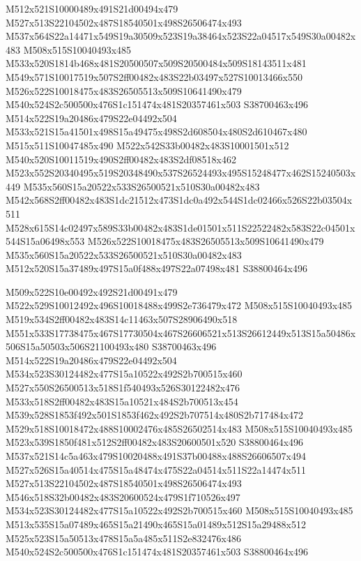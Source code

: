 \documentclass{article}
\begin{document}
\begin{multicols}{2}

M512x521S10000489x491S21d00494x479 M527x513S22104502x487S18540501x498S26506474x493 M537x564S22a14471x549S19a30509x523S19a38464x523S22a04517x549S30a00482x483 M508x515S10040493x485 M533x520S1814b468x481S20500507x509S20500484x509S18143511x481 M549x571S10017519x507S2ff00482x483S22b03497x527S10013466x550 M526x522S10018475x483S26505513x509S10641490x479 M540x524S2c500500x476S1c151474x481S20357461x503 S38700463x496 M514x522S19a20486x479S22e04492x504 M533x521S15a41501x498S15a49475x498S2d608504x480S2d610467x480 M515x511S10047485x490 M522x542S33b00482x483S10001501x512 M540x520S10011519x490S2ff00482x483S2df08518x462 M523x552S20340495x519S20348490x537S26524493x495S15248477x462S15240503x449 M535x560S15a20522x533S26500521x510S30a00482x483 M542x568S2ff00482x483S1dc21512x473S1dc0a492x544S1dc02466x526S22b03504x511 M528x615S14c02497x589S33b00482x483S1de01501x511S22522482x583S22c04501x544S15a06498x553 M526x522S10018475x483S26505513x509S10641490x479 M535x560S15a20522x533S26500521x510S30a00482x483 M512x520S15a37489x497S15a0f488x497S22a07498x481 S38800464x496

M509x522S10e00492x492S21d00491x479 M522x529S10012492x496S10018488x499S2e736479x472 M508x515S10040493x485 M519x534S2ff00482x483S14c11463x507S28906490x518 M551x533S17738475x467S17730504x467S26606521x513S26612449x513S15a50486x506S15a50503x506S21100493x480 S38700463x496 M514x522S19a20486x479S22e04492x504 M534x523S30124482x477S15a10522x492S2b700515x460 M527x550S26500513x518S1f540493x526S30122482x476 M533x518S2ff00482x483S15a10521x484S2b700513x454 M539x528S1853f492x501S1853f462x492S2b707514x480S2b717484x472 M529x518S10018472x488S10002476x485S26502514x483 M508x515S10040493x485 M523x539S1850f481x512S2ff00482x483S20600501x520 S38800464x496 M537x521S14c5a463x479S10020488x491S37b00488x488S26606507x494 M527x526S15a40514x475S15a48474x475S22a04514x511S22a14474x511 M527x513S22104502x487S18540501x498S26506474x493 M546x518S32b00482x483S20600524x479S1f710526x497 M534x523S30124482x477S15a10522x492S2b700515x460 M508x515S10040493x485 M513x535S15a07489x465S15a21490x465S15a01489x512S15a29488x512 M525x523S15a50513x478S15a5a485x511S2e832476x486 M540x524S2c500500x476S1c151474x481S20357461x503 S38800464x496


\end{multicols}
\end{document}
